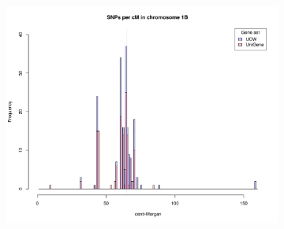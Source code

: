 \begin{figure}
  \centering
  \begin{subfigure}{0.8\textwidth}
  \caption{}
   \label{fig:yr15:snpsBFR6Chr1B}
   \includegraphics[width=1\textwidth]{Yr15/Figures/mapping/snpsBFR6crh1B.pdf}
  \end{subfigure}
  

\end{figure}

